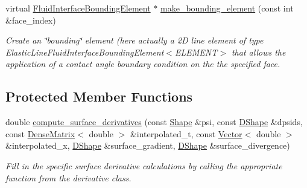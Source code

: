 \begin{DoxyCompactItemize}
virtual \hyperlink{classoomph_1_1FluidInterfaceBoundingElement}{Fluid\+Interface\+Bounding\+Element} $\ast$ \hyperlink{classoomph_1_1ElasticUpdateFluidInterfaceElement_a91c59905720a4417447fcce09032ce7f}{make\+\_\+bounding\+\_\+element} (const int \&face\+\_\+index)
\begin{DoxyCompactList}\small\item\em Create an \char`\"{}bounding\char`\"{} element (here actually a 2D line element of type Elastic\+Line\+Fluid\+Interface\+Bounding\+Element$<$\+E\+L\+E\+M\+E\+N\+T$>$ that allows the application of a contact angle boundary condition on the the specified face. \end{DoxyCompactList}\end{DoxyCompactItemize}
\subsection*{Protected Member Functions}
\begin{DoxyCompactItemize}
\item 
double \hyperlink{classoomph_1_1ElasticUpdateFluidInterfaceElement_ae9df6c11ccb63dc04c0d5ca655fe1482}{compute\+\_\+surface\+\_\+derivatives} (const \hyperlink{classoomph_1_1Shape}{Shape} \&psi, const \hyperlink{classoomph_1_1DShape}{D\+Shape} \&dpsids, const \hyperlink{classoomph_1_1DenseMatrix}{Dense\+Matrix}$<$ double $>$ \&interpolated\+\_\+t, const \hyperlink{classoomph_1_1Vector}{Vector}$<$ double $>$ \&interpolated\+\_\+x, \hyperlink{classoomph_1_1DShape}{D\+Shape} \&surface\+\_\+gradient, \hyperlink{classoomph_1_1DShape}{D\+Shape} \&surface\+\_\+divergence)
\begin{DoxyCompactList}\small\item\em Fill in the specific surface derivative calculations by calling the appropriate function from the derivative class. \end{DoxyCompactList}\end{DoxyCompactItemize}
